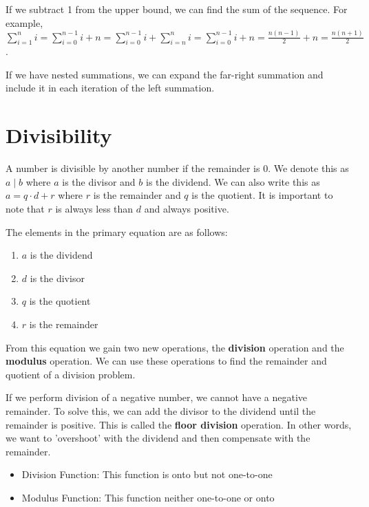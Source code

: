 \documentclass[11pt]{article}
\begin{document}
If we subtract 1 from the upper bound, we can find the sum of the sequence. For example, \(\sum_{i=1}^n i = \sum_{i=0}^{n-1} i + n = \sum_{i=0}^{n-1} i + \sum_{i=n}^n i = \sum_{i=0}^{n-1} i + n = \frac{n(n-1)}{2} + n = \frac{n(n+1)}{2}\).

If we have nested summations, we can expand the far-right summation and include it in each iteration of the left summation.

\section{Divisibility}
\label{sec:org7f1f72e}
A number is divisible by another number if the remainder is 0. We denote this as \(a \mid b\) where \(a\) is the divisor and \(b\) is the dividend. We can also write this as \(a = q \cdot d + r\) where \(r\) is the remainder and \(q\) is the quotient. It is important to note that \(r\) is always less than \(d\) and always positive.

The elements in the primary equation are as follows:
\begin{enumerate}
\item \(a\) is the dividend
\item \(d\) is the divisor
\item \(q\) is the quotient
\item \(r\) is the remainder
\end{enumerate}

From this equation we gain two new operations, the \textbf{division} operation and the \textbf{modulus} operation. We can use these operations to find the remainder and quotient of a division problem.

If we perform division of a negative number, we cannot have a negative remainder. To solve this, we can add the divisor to the dividend until the remainder is positive. This is called the \textbf{floor division} operation. In other words, we want to 'overshoot' with the dividend and then compensate with the remainder.

\begin{itemize}
\item Division Function: This function is onto but not one-to-one
\item Modulus Function: This function neither one-to-one or onto
\end{itemize}
\end{document}
